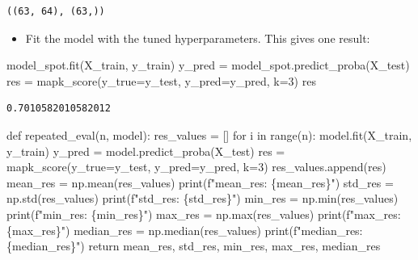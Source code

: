 \documentclass[
  letterpaper,
  DIV=11,
  numbers=noendperiod]{scrreprt}
\newenvironment{Shaded}{\begin{snugshade}}{\end{snugshade}}
\newcommand{\BuiltInTok}[1]{\textcolor[rgb]{0.00,0.23,0.31}{#1}}
\newcommand{\ControlFlowTok}[1]{\textcolor[rgb]{0.00,0.23,0.31}{#1}}
\newcommand{\DecValTok}[1]{\textcolor[rgb]{0.68,0.00,0.00}{#1}}
\newcommand{\KeywordTok}[1]{\textcolor[rgb]{0.00,0.23,0.31}{#1}}
\newcommand{\NormalTok}[1]{\textcolor[rgb]{0.00,0.23,0.31}{#1}}
\newcommand{\OperatorTok}[1]{\textcolor[rgb]{0.37,0.37,0.37}{#1}}
\newcommand{\SpecialCharTok}[1]{\textcolor[rgb]{0.37,0.37,0.37}{#1}}
\newcommand{\SpecialStringTok}[1]{\textcolor[rgb]{0.13,0.47,0.30}{#1}}
\providecommand{\tightlist}{%
  \setlength{\itemsep}{0pt}\setlength{\parskip}{0pt}}\usepackage{longtable,booktabs,array}
\begin{document}
\begin{verbatim}
((63, 64), (63,))
\end{verbatim}

\begin{itemize}
\tightlist
\item
  Fit the model with the tuned hyperparameters. This gives one result:
\end{itemize}

\begin{Shaded}
\begin{Highlighting}[]
\NormalTok{model\_spot.fit(X\_train, y\_train)}
\NormalTok{y\_pred }\OperatorTok{=}\NormalTok{ model\_spot.predict\_proba(X\_test)}
\NormalTok{res }\OperatorTok{=}\NormalTok{ mapk\_score(y\_true}\OperatorTok{=}\NormalTok{y\_test, y\_pred}\OperatorTok{=}\NormalTok{y\_pred, k}\OperatorTok{=}\DecValTok{3}\NormalTok{)}
\NormalTok{res}
\end{Highlighting}
\end{Shaded}

\begin{verbatim}
0.7010582010582012
\end{verbatim}

\begin{Shaded}
\begin{Highlighting}[]
\KeywordTok{def}\NormalTok{ repeated\_eval(n, model):}
\NormalTok{    res\_values }\OperatorTok{=}\NormalTok{ []}
    \ControlFlowTok{for}\NormalTok{ i }\KeywordTok{in} \BuiltInTok{range}\NormalTok{(n):}
\NormalTok{        model.fit(X\_train, y\_train)}
\NormalTok{        y\_pred }\OperatorTok{=}\NormalTok{ model.predict\_proba(X\_test)}
\NormalTok{        res }\OperatorTok{=}\NormalTok{ mapk\_score(y\_true}\OperatorTok{=}\NormalTok{y\_test, y\_pred}\OperatorTok{=}\NormalTok{y\_pred, k}\OperatorTok{=}\DecValTok{3}\NormalTok{)}
\NormalTok{        res\_values.append(res)}
\NormalTok{    mean\_res }\OperatorTok{=}\NormalTok{ np.mean(res\_values)}
    \BuiltInTok{print}\NormalTok{(}\SpecialStringTok{f"mean\_res: }\SpecialCharTok{\{}\NormalTok{mean\_res}\SpecialCharTok{\}}\SpecialStringTok{"}\NormalTok{)}
\NormalTok{    std\_res }\OperatorTok{=}\NormalTok{ np.std(res\_values)}
    \BuiltInTok{print}\NormalTok{(}\SpecialStringTok{f"std\_res: }\SpecialCharTok{\{}\NormalTok{std\_res}\SpecialCharTok{\}}\SpecialStringTok{"}\NormalTok{)}
\NormalTok{    min\_res }\OperatorTok{=}\NormalTok{ np.}\BuiltInTok{min}\NormalTok{(res\_values)}
    \BuiltInTok{print}\NormalTok{(}\SpecialStringTok{f"min\_res: }\SpecialCharTok{\{}\NormalTok{min\_res}\SpecialCharTok{\}}\SpecialStringTok{"}\NormalTok{)}
\NormalTok{    max\_res }\OperatorTok{=}\NormalTok{ np.}\BuiltInTok{max}\NormalTok{(res\_values)}
    \BuiltInTok{print}\NormalTok{(}\SpecialStringTok{f"max\_res: }\SpecialCharTok{\{}\NormalTok{max\_res}\SpecialCharTok{\}}\SpecialStringTok{"}\NormalTok{)}
\NormalTok{    median\_res }\OperatorTok{=}\NormalTok{ np.median(res\_values)}
    \BuiltInTok{print}\NormalTok{(}\SpecialStringTok{f"median\_res: }\SpecialCharTok{\{}\NormalTok{median\_res}\SpecialCharTok{\}}\SpecialStringTok{"}\NormalTok{)}
    \ControlFlowTok{return}\NormalTok{ mean\_res, std\_res, min\_res, max\_res, median\_res}
\end{Highlighting}
\end{Shaded}
\end{document}

